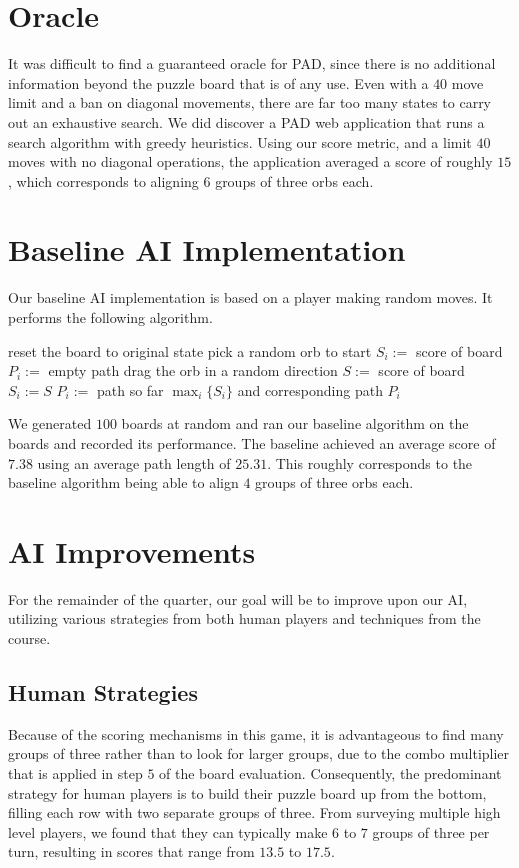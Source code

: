 \documentclass[journal,final,letterpaper,11pt]{IEEEtran}
\begin{document}
\section{Oracle}
It was difficult to find a guaranteed oracle for PAD, since there is no additional information beyond the puzzle board that is of any use. Even with a $40$ move limit and a ban on diagonal movements, there are far too many states to carry out an exhaustive search. We did discover a PAD web application that runs a search algorithm with greedy heuristics. Using our score metric, and a limit $40$ moves with no diagonal operations, the application averaged a score of roughly $15$, which corresponds to aligning $6$ groups of three orbs each.

\section{Baseline AI Implementation}
Our baseline AI implementation is based on a player making random moves. It performs the following algorithm.
\begin{algorithmic}[1]
  \STATE reset the board to original state
  \STATE pick a random orb to start
  \STATE $S_i :=$ score of board
  \STATE $P_i :=$ empty path
    \STATE drag the orb in a random direction
    \STATE $S :=$ score of board
      \STATE $S_i := S$
      \STATE $P_i :=$ path so far
    \ENDIF
  \ENDFOR
\ENDFOR
\RETURN $\max_{i}\{S_i\}$ and corresponding path $P_i$
\end{algorithmic}
We generated $100$ boards at random and ran our baseline algorithm on the boards and recorded its performance. The baseline achieved an average score of $7.38$ using an average path length of $25.31$. This roughly corresponds to the baseline algorithm being able to align $4$ groups of three orbs each.

\section{AI Improvements}
For the remainder of the quarter, our goal will be to improve upon our AI, utilizing various strategies from both human players and techniques from the course.
\vspace*{-0.15in}
\subsection{Human Strategies}
Because of the scoring mechanisms in this game, it is advantageous to find many groups of three rather than to look for larger groups, due to the combo multiplier that is applied in step $5$ of the board evaluation. Consequently, the predominant strategy for human players is to build their puzzle board up from the bottom, filling each row with two separate groups of three. From surveying multiple high level players, we found that they can typically make $6$ to $7$ groups of three per turn, resulting in scores that range from $13.5$ to $17.5$.
\vspace*{-0.15in}
\end{document}
